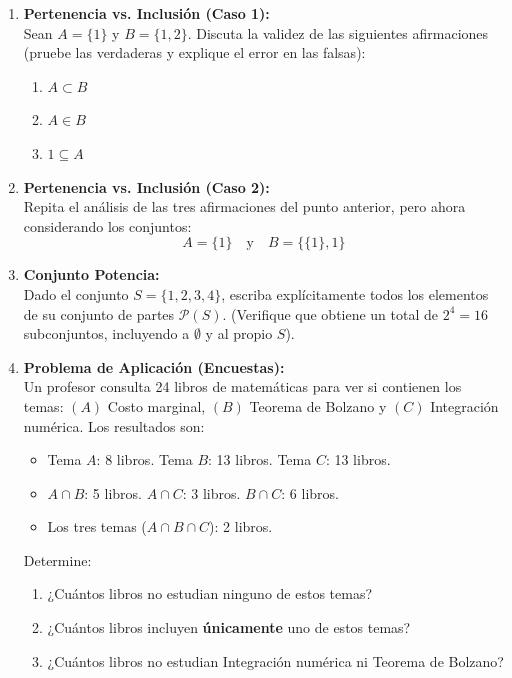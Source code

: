 \begin{enumerate}
    \item \textbf{Pertenencia vs. Inclusión (Caso 1):} \\
    Sean $A = \{1 \}$ y $B = \{1, 2\}$. Discuta la validez de las siguientes afirmaciones (pruebe las verdaderas y explique el error en las falsas):
    \begin{enumerate}
        \item $A \subset B$
        \item $A \in B$
        \item $1 \subseteq A$
    \end{enumerate}

    \item \textbf{Pertenencia vs. Inclusión (Caso 2):} \\
    Repita el análisis de las tres afirmaciones del punto anterior, pero ahora considerando los conjuntos:
    \[ A = \{1\} \quad \text{y} \quad B = \{\{1\}, 1\} \]

    \item \textbf{Conjunto Potencia:} \\
    Dado el conjunto $S = \{1, 2, 3, 4\}$, escriba explícitamente todos los elementos de su conjunto de partes $\mathcal{P}(S)$. (Verifique que obtiene un total de $2^4=16$ subconjuntos, incluyendo a $\emptyset$ y al propio $S$).

    \item \textbf{Problema de Aplicación (Encuestas):} \\
    Un profesor consulta 24 libros de matemáticas para ver si contienen los temas: $(A)$ Costo marginal, $(B)$ Teorema de Bolzano y $(C)$ Integración numérica. Los resultados son:
    \begin{itemize}
        \item Tema $A$: 8 libros. \quad Tema $B$: 13 libros. \quad Tema $C$: 13 libros.
        \item $A \cap B$: 5 libros. \quad $A \cap C$: 3 libros. \quad $B \cap C$: 6 libros.
        \item Los tres temas ($A \cap B \cap C$): 2 libros.
    \end{itemize}
    Determine:
    \begin{enumerate}
        \item ¿Cuántos libros no estudian ninguno de estos temas?
        \item ¿Cuántos libros incluyen \textbf{únicamente} uno de estos temas?
        \item ¿Cuántos libros no estudian Integración numérica ni Teorema de Bolzano?
    \end{enumerate}


\end{enumerate}
